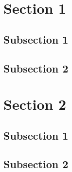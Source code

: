 \documentclass[xcolor=dvipsnames]{beamer}
\begin{document}
    \begin{frame}
        \titlepage
    \end{frame}

    \begin{frame}[label=toc]
        \tableofcontents
    \end{frame}

    \section{Section 1}
    \subsection{Subsection 1}
    \subsection{Subsection 2}
    \section{Section 2}
    \subsection{Subsection 1}
    \subsection{Subsection 2}
\end{document}
